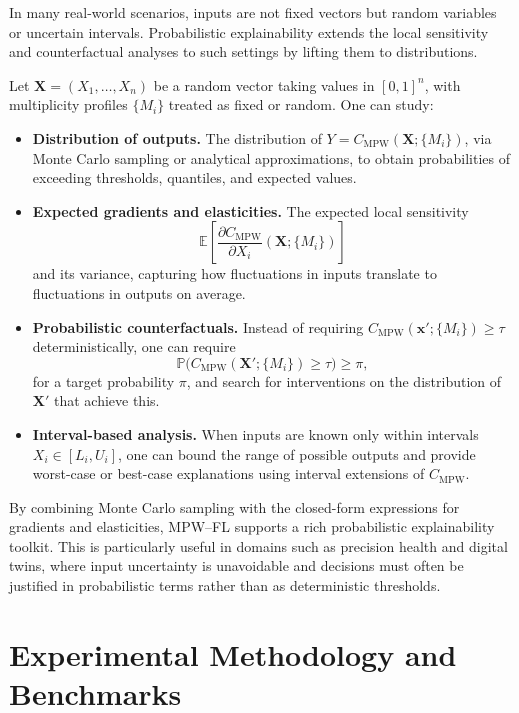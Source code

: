 \documentclass[11pt]{article}
\begin{document}
In many real-world scenarios, inputs are not fixed vectors but random variables or uncertain intervals. Probabilistic explainability extends the local sensitivity and counterfactual analyses to such settings by lifting them to distributions.

Let $\mathbf{X} = (X_1,\dots,X_n)$ be a random vector taking values in $[0,1]^n$, with multiplicity profiles $\{M_i\}$ treated as fixed or random. One can study:
\begin{itemize}
  \item \textbf{Distribution of outputs.} The distribution of $Y = C_{\mathrm{MPW}}(\mathbf{X};\{M_i\})$, via Monte Carlo sampling or analytical approximations, to obtain probabilities of exceeding thresholds, quantiles, and expected values.
  \item \textbf{Expected gradients and elasticities.} The expected local sensitivity
  \[
    \mathbb{E}\left[\frac{\partial C_{\mathrm{MPW}}}{\partial X_i}(\mathbf{X};\{M_i\})\right]
  \]
  and its variance, capturing how fluctuations in inputs translate to fluctuations in outputs on average.
  \item \textbf{Probabilistic counterfactuals.} Instead of requiring $C_{\mathrm{MPW}}(\mathbf{x}';\{M_i\}) \ge \tau$ deterministically, one can require
  \[
    \mathbb{P}\big(C_{\mathrm{MPW}}(\mathbf{X}';\{M_i\}) \ge \tau\big) \ge \pi,
  \]
  for a target probability $\pi$, and search for interventions on the distribution of $\mathbf{X}'$ that achieve this.
  \item \textbf{Interval-based analysis.} When inputs are known only within intervals $X_i \in [L_i,U_i]$, one can bound the range of possible outputs and provide worst-case or best-case explanations using interval extensions of $C_{\mathrm{MPW}}$.
\end{itemize}

By combining Monte Carlo sampling with the closed-form expressions for gradients and elasticities, MPW--FL supports a rich probabilistic explainability toolkit. This is particularly useful in domains such as precision health and digital twins, where input uncertainty is unavoidable and decisions must often be justified in probabilistic terms rather than as deterministic thresholds.

\section{Experimental Methodology and Benchmarks}
\label{sec:experiments}
\end{document}
